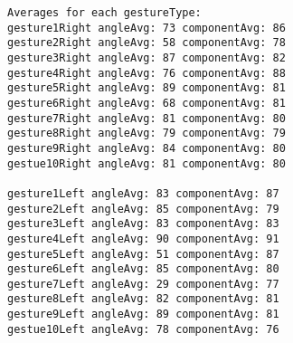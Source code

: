 \begin{verbatim}
Averages for each gestureType:
gesture1Right angleAvg: 73 componentAvg: 86
gesture2Right angleAvg: 58 componentAvg: 78
gesture3Right angleAvg: 87 componentAvg: 82
gesture4Right angleAvg: 76 componentAvg: 88
gesture5Right angleAvg: 89 componentAvg: 81
gesture6Right angleAvg: 68 componentAvg: 81
gesture7Right angleAvg: 81 componentAvg: 80
gesture8Right angleAvg: 79 componentAvg: 79
gesture9Right angleAvg: 84 componentAvg: 80
gestue10Right angleAvg: 81 componentAvg: 80

gesture1Left angleAvg: 83 componentAvg: 87
gesture2Left angleAvg: 85 componentAvg: 79
gesture3Left angleAvg: 83 componentAvg: 83
gesture4Left angleAvg: 90 componentAvg: 91
gesture5Left angleAvg: 51 componentAvg: 87
gesture6Left angleAvg: 85 componentAvg: 80
gesture7Left angleAvg: 29 componentAvg: 77
gesture8Left angleAvg: 82 componentAvg: 81
gesture9Left angleAvg: 89 componentAvg: 81
gestue10Left angleAvg: 78 componentAvg: 76
\end{verbatim}
